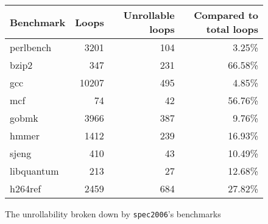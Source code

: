 \begin{figure}[H]
    \begin{center}
        \begin{tabular}{lrrr}
            \toprule
            Benchmark & Loops & Unrollable loops & Compared to total loops\\
            \midrule
            perlbench & 3201 & 104 & 3.25\%\\
            bzip2 & 347 & 231 & 66.58\%\\
            gcc & 10207  & 495 & 4.85\%\\
            mcf & 74 & 42 & 56.76\%\\
            gobmk & 3966 & 387 & 9.76\%\\
            hmmer & 1412 & 239 & 16.93\%\\
            sjeng & 410 & 43 & 10.49\% \\
            libquantum & 213 & 27 & 12.68\%\\
            h264ref & 2459 & 684 & 27.82\%\\
            \bottomrule
        \end{tabular}
    \end{center}
    \caption{The unrollability broken down by \texttt{spec2006}'s benchmarks}
    \label{fig:eval:unrollability:cmp-unrollability-bench}
\end{figure}